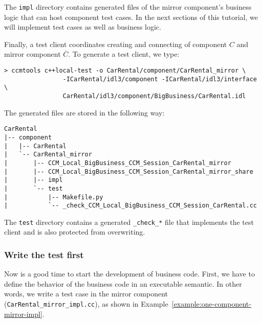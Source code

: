 The {\tt impl} directory contains generated files of the mirror
component's business logic that can host component test cases.
In the next sections of this tutorial, we will implement test cases as well
as business logic. 


Finally, a test client coordinates creating and connecting of component $C$ and 
mirror component $\overline{C}$.
To generate a test client, we type:
\begin{small}
\begin{verbatim}
> ccmtools c++local-test -o CarRental/component/CarRental_mirror \
                -ICarRental/idl3/component -ICarRental/idl3/interface \
                CarRental/idl3/component/BigBusiness/CarRental.idl
\end{verbatim}
\end{small}

The generated files are stored in the following way:
\begin{small}
\begin{verbatim}
CarRental
|-- component
|   |-- CarRental
|   `-- CarRental_mirror
|       |-- CCM_Local_BigBusiness_CCM_Session_CarRental_mirror
|       |-- CCM_Local_BigBusiness_CCM_Session_CarRental_mirror_share
|       |-- impl
|       `-- test
|           |-- Makefile.py
|           `-- _check_CCM_Local_BigBusiness_CCM_Session_CarRental.cc
\end{verbatim}
\end{small}

The {\tt test} directory contains a generated {\tt \_check\_*} file that 
implements the test client and is also protected from overwriting.




\subsubsection{Write the test first}

Now is a good time to start the development of business code. First, we have to
define the behavior of the business code in an executable semantic. 
In other words, we write a test case in the mirror component 
({\tt CarRental\_mirror\_impl.cc}), as
shown in Example~\ref{example:one-component-mirror-impl}.


